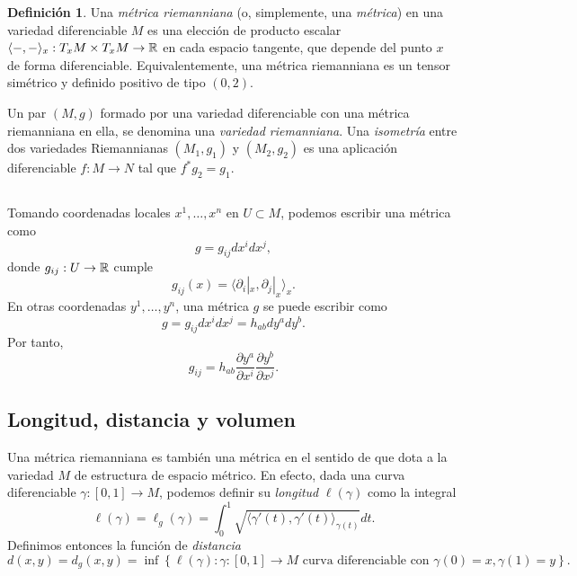 \documentclass[11pt,a4paper]{amsbook}
\theoremstyle{remark} \newtheorem{rmk}[subsection]{Observación}
\theoremstyle{definition} \newtheorem{defn}[subsection]{Definición}
\theoremstyle{definition} \newtheorem{ex}[subsection]{Ejemplo}
\theoremstyle{definition} \newtheorem{ej}[subsection]{Ejercicio}
\begin{document}
\begin{defn}
  Una \emph{métrica riemanniana} (o, simplemente, una \emph{métrica}) en una variedad diferenciable $M$ es una elección de producto escalar $\langle-,-\rangle_x:T_xM \times T_xM \rightarrow \mathbb R$ en cada espacio tangente, que depende del punto $x$ de forma diferenciable. Equivalentemente, una métrica riemanniana es un tensor simétrico y definido positivo de tipo $(0,2)$.

  Un par $(M,g)$ formado por una variedad diferenciable con una métrica riemanniana en ella, se denomina una \emph{variedad riemanniana}. Una \emph{isometría} entre dos variedades Riemannianas $(M_1,g_1)$ y $(M_2,g_2)$ es una aplicación diferenciable  $f:M\rightarrow N$ tal que $f^*g_2 = g_1$.
\end{defn}

\subsection{} Tomando coordenadas locales $x^1,\dots,x^n$ en $U\subset M$, podemos escribir una métrica como
\begin{equation*}
g = g_{ij} dx^i dx^j,
\end{equation*}
donde $g_{ij}:U\rightarrow \mathbb R$ cumple
\begin{equation*}
g_{ij}(x) = \langle \partial_i|_x, \partial_j|_x \rangle_x.
\end{equation*}
En otras coordenadas $y^1,\dots,y^n$, una métrica $g$ se puede escribir como
\begin{equation*}
g= g_{ij} dx^idx^j = h_{ab} dy^a dy^b.
\end{equation*}
Por tanto,
\begin{equation*}
g_{ij} = h_{ab} \frac{\partial y^a}{\partial x^i} \frac{\partial y^b}{\partial x^j}.
\end{equation*}

\subsection{Longitud, distancia y volumen}
  Una métrica riemanniana es también una métrica en el sentido de que dota a la variedad $M$ de estructura de espacio métrico. En efecto, dada una curva diferenciable $\gamma:[0,1]\rightarrow M$, podemos definir su \emph{longitud} $\ell(\gamma)$ como la integral
  \begin{equation*}
\ell(\gamma)=\ell_g(\gamma) = \int_0^1  \sqrt{\langle \gamma'(t), \gamma'(t) \rangle_{\gamma(t)}} dt.
  \end{equation*}
  Definimos entonces la función de \emph{distancia}
  \begin{equation*}
d(x,y)=d_g(x,y) = \inf \left\{ \ell(\gamma): \gamma:[0,1] \rightarrow M \text{ curva diferenciable con } \gamma(0)=x, \gamma(1)=y   \right\}.
  \end{equation*}
\end{document}

